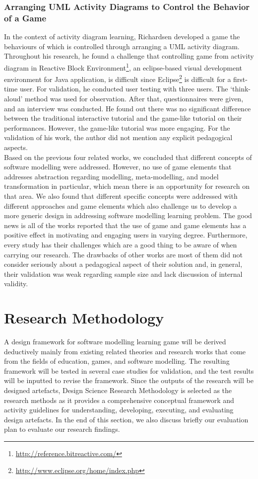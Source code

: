 \documentclass[12pt, a4paper]{report}
\begin{document}
\subsubsection{Arranging UML Activity Diagrams to Control the Behavior of a Game}
In the context of activity diagram learning, Richardsen \cite{Richardsen2014} developed a game the behaviours of which is controlled through arranging a UML activity diagram. Throughout his research, he found a challenge that controlling game from activity diagram in Reactive Block Environment\footnote{\url{http://reference.bitreactive.com/}}, an eclipse-based visual development environment for Java application, is difficult since Eclipse\footnote{\url{http://www.eclipse.org/home/index.php}} is difficult for a first-time user. For validation, he conducted user testing with three users. The `think-aloud' method was used for observation. After that, questionnaires were given, and an interview was conducted. He found out there was no significant difference between the traditional interactive tutorial and the game-like tutorial on their performances. However, the game-like tutorial was more engaging. For the validation of his work, the author did not mention any explicit pedagogical aspects.\\

Based on the previous four related works, we concluded that different concepts of software modelling were addressed. However, no use of game elements that addresses abstraction regarding modelling, meta-modelling, and model transformation in particular, which mean there is an opportunity for research on that area. We also found that different specific concepts were addressed with different approaches and game elements which also challenge us to develop a more generic design in addressing software modelling learning problem. The good news is all of the works reported that the use of game and game elements has a positive effect in motivating and engaging users in varying degree. Furthermore, every study has their challenges which are a good thing to be aware of when carrying our research. The drawbacks of other works are most of them did not consider seriously about a pedagogical aspect of their solution and, in general, their validation was weak regarding sample size and lack discussion of internal validity.

\section{Research Methodology}
A design framework for software modelling learning game will be derived deductively mainly from existing related theories and research works that come from the fields of education, games, and software modelling. The resulting framework will be tested in several case studies for validation, and the test results will be inputted to revise the framework. Since the outputs of the research will be designed artefacts, Design Science Research Methodology \cite{peffers2007design} is selected as the research methods as it provides a comprehensive conceptual framework and activity guidelines for understanding, developing, executing, and evaluating design artefacts. In the end of this section, we also discuss  briefly our evaluation plan to evaluate our research findings.  
\end{document}
